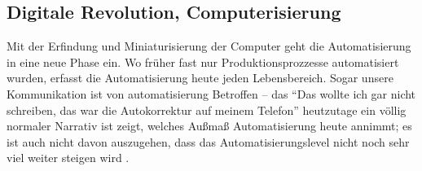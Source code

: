 \subsection {Digitale Revolution, Computerisierung}
Mit der Erfindung und Miniaturisierung der Computer geht die Automatisierung in eine neue Phase ein. Wo früher fast nur Produktionsprozzesse automatisiert wurden, erfasst die Automatisierung heute jeden Lebensbereich.
Sogar unsere Kommunikation ist von automatisierung Betroffen – das \enquote{Das wollte ich gar nicht schreiben, das war die Autokorrektur auf meinem Telefon} heutzutage ein völlig normaler Narrativ ist zeigt, welches Außmaß Automatisierung heute annimmt; es ist auch nicht davon auszugehen, dass das Automatisierungslevel nicht noch sehr viel weiter steigen wird \parencite{arbeitsfrei}.
